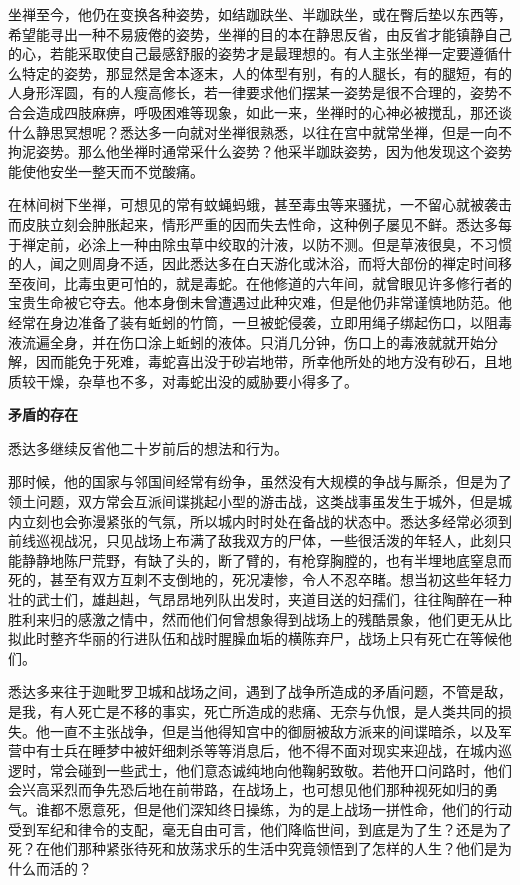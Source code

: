 \documentclass[twoside,openany]{book}
\newcommand{\mt}[1]{\textbullet \textbf{#1}}
\begin{document}
坐禅至今，他仍在变换各种姿势，如结跏趺坐、半跏趺坐，或在臀后垫以东西等，希望能寻出一种不易疲倦的姿势，坐禅的目的本在静思反省，由反省才能镇静自己的心，若能采取使自己最感舒服的姿势才是最理想的。有人主张坐禅一定要遵循什么特定的姿势，那显然是舍本逐末，人的体型有别，有的人腿长，有的腿短，有的人身形浑圆，有的人瘦高修长，若一律要求他们摆某一姿势是很不合理的，姿势不合会造成四肢麻痹，呼吸困难等现象，如此一来，坐禅时的心神必被搅乱，那还谈什么静思冥想呢？悉达多一向就对坐禅很熟悉，以往在宫中就常坐禅，但是一向不拘泥姿势。那么他坐禅时通常采什么姿势？他采半跏趺姿势，因为他发现这个姿势能使他安坐一整天而不觉酸痛。

在林间树下坐禅，可想见的常有蚊蝇蚂蛾，甚至毒虫等来骚扰，一不留心就被袭击而皮肤立刻会肿胀起来，情形严重的因而失去性命，这种例子屡见不鲜。悉达多每于禅定前，必涂上一种由除虫草中绞取的汁液，以防不测。但是草液很臭，不习惯的人，闻之则周身不适，因此悉达多在白天游化或沐浴，而将大部份的禅定时间移至夜间，比毒虫更可怕的，就是毒蛇。在他修道的六年间，就曾眼见许多修行者的宝贵生命被它夺去。他本身倒未曾遭遇过此种灾难，但是他仍非常谨慎地防范。他经常在身边准备了装有蚯蚓的竹筒，一旦被蛇侵袭，立即用绳子绑起伤口，以阻毒液流遍全身，并在伤口涂上蚯蚓的液体。只消几分钟，伤口上的毒液就就开始分解，因而能免于死难，毒蛇喜出没于砂岩地带，所幸他所处的地方没有砂石，且地质较干燥，杂草也不多，对毒蛇出没的威胁要小得多了。

\mt{矛盾的存在}

悉达多继续反省他二十岁前后的想法和行为。

那时候，他的国家与邻国间经常有纷争，虽然没有大规模的争战与厮杀，但是为了领土问题，双方常会互派间谍挑起小型的游击战，这类战事虽发生于城外，但是城内立刻也会弥漫紧张的气氛，所以城内时时处在备战的状态中。悉达多经常必须到前线巡视战况，只见战场上布满了敌我双方的尸体，一些很活泼的年轻人，此刻只能静静地陈尸荒野，有缺了头的，断了臂的，有枪穿胸膛的，也有半埋地底窒息而死的，甚至有双方互刺不支倒地的，死况凄惨，令人不忍卒睹。想当初这些年轻力壮的武士们，雄赳赳，气昂昂地列队出发时，夹道目送的妇孺们，往往陶醉在一种胜利来归的感激之情中，然而他们何曾想象得到战场上的残酷景象，他们更无从比拟此时整齐华丽的行进队伍和战时腥臊血垢的横陈弃尸，战场上只有死亡在等候他们。

悉达多来往于迦毗罗卫城和战场之间，遇到了战争所造成的矛盾问题，不管是敌，是我，有人死亡是不移的事实，死亡所造成的悲痛、无奈与仇恨，是人类共同的损失。他一直不主张战争，但是当他得知宫中的御厨被敌方派来的间谍暗杀，以及军营中有士兵在睡梦中被奸细刺杀等等消息后，他不得不面对现实来迎战，在城内巡逻时，常会碰到一些武士，他们意态诚纯地向他鞠躬致敬。若他开口问路时，他们会兴高采烈而争先恐后地在前带路，在战场上，也可想见他们那种视死如归的勇气。谁都不愿意死，但是他们深知终日操练，为的是上战场一拼性命，他们的行动受到军纪和律令的支配，毫无自由可言，他们降临世间，到底是为了生？还是为了死？在他们那种紧张待死和放荡求乐的生活中究竟领悟到了怎样的人生？他们是为什么而活的？
\end{document}
